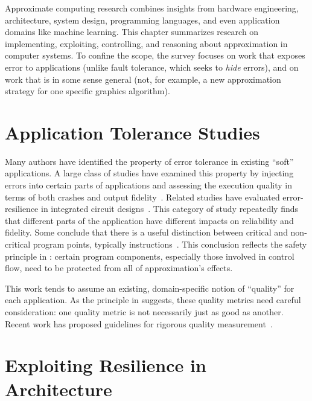 Approximate computing research combines insights from hardware engineering,
architecture, system design, programming languages, and even application
domains like machine learning.
This chapter summarizes research on implementing, exploiting,
controlling, and reasoning about approximation in computer systems.
To confine the scope, the survey focuses on work that exposes error to
applications (unlike fault tolerance, which seeks to \emph{hide}
errors),
and on work that is in some sense general (not, for example, a new approximation
strategy for one specific graphics algorithm).

\section{Application Tolerance Studies}
\label{sec:related:studies}

Many authors have identified the property of error tolerance in existing
``soft''
applications. A large class of studies have examined this property by
injecting errors into certain parts of applications and assessing the
execution quality in terms of both crashes and output fidelity~\cite{li06,
li07, li08, dekruijf-selse09, wong-selse06, palem-arcs, freton, besteffort,
yeh, thaker-iiswc06, efc, llfi, chippa-dac}.
Related
studies have evaluated error-resilience in
integrated circuit designs~\cite{breuer, scalable-effort-hardware}.
This category of study repeatedly finds that
different parts of the
application have different impacts on reliability and fidelity.
Some conclude
that there is a useful distinction between critical and non-critical program
points, typically instructions~\cite{palem-arcs, thaker-iiswc06, flikker,
llfi}.
This conclusion reflects
the safety principle in :
certain program components, especially those involved in control flow, need to
be protected from all of approximation's effects.

This work tends to assume an existing,
domain-specific notion of ``quality'' for each
application.
As the principle in  suggests, these quality metrics
need careful consideration: one quality metric is not necessarily just as good
as another.
Recent work has proposed guidelines for rigorous quality
measurement~\cite{wddd-quality}.


\section{Exploiting Resilience in Architecture}

